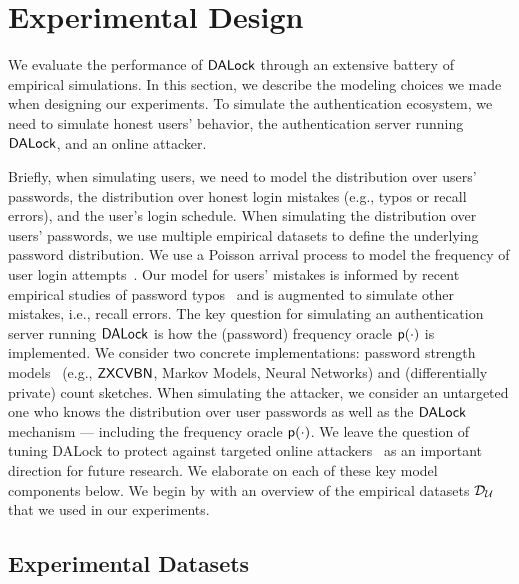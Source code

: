 \vspace*{-\baselineskip}
\section{Experimental Design} %

We evaluate the performance of $\mathsf{DALock}$ through an extensive battery of empirical simulations. In this section, we describe the modeling choices we made when designing our experiments. To simulate the authentication ecosystem, we need to simulate honest users' behavior, the authentication server running $\mathsf{DALock}$, and an online attacker. 

Briefly, when simulating users, we need to model the distribution over users’ passwords, the distribution over honest login mistakes (e.g., typos or recall errors), and the user's login schedule. When simulating the distribution over users’ passwords, we use multiple empirical datasets to define the underlying password distribution. We use a Poisson arrival process to model the frequency of user login attempts~\cite{AC:BloBluDat13}. Our model for users’ mistakes is informed by recent empirical studies of password typos~\cite{CCS:CWPCR17,SP:CAAJR16} and is augmented to simulate other mistakes, i.e., recall errors.  The key question for simulating an authentication server running $\mathsf{DALock}$ is how the (password) frequency oracle $\textsf{p}(\cdot)$ is implemented. We consider two concrete implementations: password strength models~\cite{ USENIX:Wheeler16,USENIX:USBCCKKMMS15,USENIX:MUSKBCC16} (e.g., $\mathsf{ZXCVBN}$, Markov Models, Neural Networks) and (differentially private) count sketches. When simulating the attacker, we consider an untargeted one who knows the distribution over user passwords as well as the $\mathsf{DALock}$ mechanism --- including the frequency oracle $\textsf{p}(\cdot)$. We leave the question of tuning DALock to protect against targeted online attackers~\cite{CCS:WZWYH16} as an important direction for future research. We elaborate on each of these key model components below.  We begin by with an overview of the empirical datasets $\mathcal{D}_{{\mathcal{U}}}$ that we used in our experiments.

\vspace*{-\baselineskip}
\subsection{Experimental Datasets}\label{section:experiment:experiment_dataset} 

